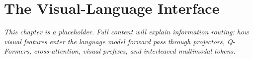 \chapter{The Visual-Language Interface}
\label{ch:visual-language-interface}


\textit{This chapter is a placeholder. Full content will explain information routing: how visual features enter the language model forward pass through projectors, Q-Formers, cross-attention, visual prefixes, and interleaved multimodal tokens.}
